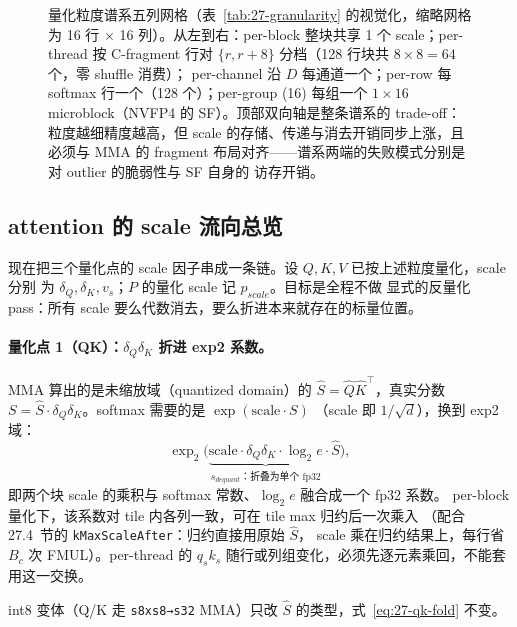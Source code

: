 \begin{figure}[H]
\caption{量化粒度谱系五列网格（表~\ref{tab:27-granularity} 的视觉化，缩略网格为
16 行 $\times$ 16 列）。从左到右：per-block 整块共享 1 个 scale；per-thread 按
C-fragment 行对 $\{r,r+8\}$ 分档（128 行块共 $8\times8=64$ 个，零 shuffle 消费）；
per-channel 沿 $D$ 每通道一个；per-row 每 softmax 行一个（128 个）；per-group (16)
每组一个 $1\times16$ microblock（NVFP4 的 SF）。顶部双向轴是整条谱系的 trade-off：
粒度越细精度越高，但 scale 的存储、传递与消去开销同步上涨，且必须与 MMA 的
fragment 布局对齐——谱系两端的失败模式分别是对 outlier 的脆弱性与 SF 自身的
访存开销。}
\label{fig:27-granularity}
\end{figure}

\subsection{attention 的 scale 流向总览}

现在把三个量化点的 scale 因子串成一条链。设 $Q,K,V$ 已按上述粒度量化，scale 分别
为 $\delta_Q, \delta_K, v_s$；$P$ 的量化 scale 记 $p_{scale}$。目标是全程不做
显式的反量化 pass：所有 scale 要么代数消去，要么折进本来就存在的标量位置。

\paragraph{量化点 1（QK）：$\delta_Q\delta_K$ 折进 exp2 系数。}
MMA 算出的是未缩放域（quantized domain）的 $\hat{S} = \hat{Q}\hat{K}^{\top}$，真实分数
$S = \hat{S} \cdot \delta_Q\delta_K$。softmax 需要的是 $\exp(\text{scale} \cdot S)$
（scale 即 $1/\sqrt{d}$），换到 exp2 域：
\begin{equation}
  \exp_2\!\Big(
    \underbrace{\text{scale} \cdot \delta_Q\delta_K \cdot \log_2 e}_{s_{dequant}\text{：折叠为单个 fp32}}
    \cdot \hat{S}
  \Big),
  \label{eq:27-qk-fold}
\end{equation}
即两个块 scale 的乘积与 softmax 常数、$\log_2 e$ 融合成一个 fp32 系数。
per-block 量化下，该系数对 tile 内各列一致，可在 tile max 归约后一次乘入
（配合 27.4~节的 \texttt{kMaxScaleAfter}：归约直接用原始 $\hat{S}$，
scale 乘在归约结果上，每行省 $B_c$ 次 FMUL）。per-thread 的 $q_s k_s$
随行或列组变化，必须先逐元素乘回，不能套用这一交换。

int8 变体（Q/K 走 \texttt{s8xs8→s32} MMA）只改 $\hat{S}$ 的类型，式~\ref{eq:27-qk-fold} 不变。

